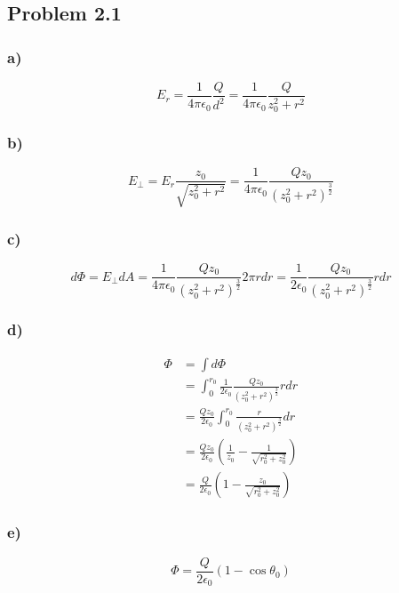 \documentclass[../homework.tex]{subfiles}
\begin{document}
\subsection{Problem 2.1}
\subsubsection*{a)}
\begin{equation*}
    E_r = \frac{1}{4 \pi \epsilon_0} \frac{Q}{d^2} = \frac{1}{4 \pi \epsilon_0} \frac{Q}{z_0^2 + r^2}
\end{equation*}
\subsubsection*{b)}
\begin{equation*}
    E_{\bot} = E_r \frac{z_0}{\sqrt{z_0^2 + r^2}} = \frac{1}{4 \pi \epsilon_0} \frac{Qz_0}{(z_0^2 + r^2)^\frac{3}{2}}
\end{equation*}
\subsubsection*{c)}
\begin{equation*}
    d\Phi = E_\bot dA = \frac{1}{4 \pi \epsilon_0} \frac{Qz_0}{(z_0^2 + r^2)^\frac{3}{2}} 2 \pi r dr
    = \frac{1}{2 \epsilon_0} \frac{Qz_0}{(z_0^2 + r^2)^\frac{3}{2}} r dr
\end{equation*}
\subsubsection*{d)}
\begin{align*}
    \Phi &= \int d\Phi \\
         &= \int_{0}^{r_0} \frac{1}{2 \epsilon_0} \frac{Qz_0}{(z_0^2 + r^2)^\frac{3}{2}} r dr \\
         &= \frac{Qz_0}{2 \epsilon_0} \int_{0}^{r_0} \frac{r}{(z_0^2 + r^2)^\frac{3}{2}}dr \\
         &= \frac{Qz_0}{2 \epsilon_0} \left(
             \frac{1}{z_0} - \frac{1}{\sqrt{r_0^2 + z_0^2}}
         \right) \\
         &= \frac{Q}{2 \epsilon_0} \left(
            1 - \frac{z_0}{\sqrt{r_0^2 + z_0^2}}
        \right)
\end{align*}
\subsubsection*{e)}
\begin{equation*}
    \Phi = \frac{Q}{2\epsilon_0} (1 - \cos{\theta_0})
\end{equation*}
\end{document}
